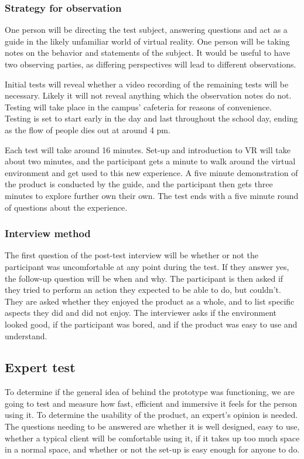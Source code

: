 
\subsubsection{Strategy for observation}

One person will be directing the test subject, answering questions and act as a guide in the likely unfamiliar world of virtual reality. One person will be taking notes on the behavior and statements of the subject. It would be useful to have two observing parties, as differing perspectives will lead to different observations. 

Initial tests will reveal whether a video recording of the remaining tests will be necessary. Likely it will not reveal anything which the observation notes do not. Testing will take place in the campus' cafeteria for reasons of convenience. Testing is set to start early in the day and last throughout the school day, ending as the flow of people dies out at around 4 pm.

Each test will take around 16 minutes. Set-up and introduction to VR will take about two minutes, and the participant gets a minute to walk around the virtual environment and get used to this new experience. A five minute demonstration of the product is conducted by the guide, and the participant then gets three minutes to explore further own their own. The test ends with a five minute round of questions about the experience. 



\subsubsection{Interview method}
The first question of the post-test interview will be whether or not the participant was uncomfortable at any point during the test. If they answer yes, the follow-up question will be when and why.
The participant is then asked if they tried to perform an action they expected to be able to do, but couldn't. They are asked whether they enjoyed the product as a whole, and to list specific aspects they did and did not enjoy. The interviewer asks if the environment looked good, if the participant was bored, and if the product was easy to use and understand. 

\subsection{Expert test}
To determine if the general idea of behind the prototype was functioning, we are going to test and measure how fast, efficient and immersive it feels for the person using it.
To determine the usability of the product, an expert's opinion is needed. The questions needing to be answered are whether it is well designed, easy to use, whether a typical client will be comfortable using it, if it takes up too much space in a normal space, and whether or not the set-up is easy enough for anyone to do.
